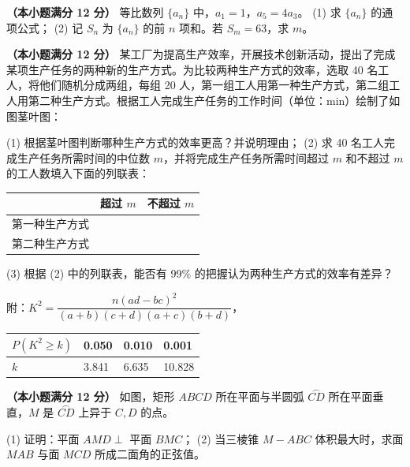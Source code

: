 \begin{question}
\textbf{（本小题满分 12 分）} 
等比数列 $\{a_n\}$ 中，$a_1 = 1$，$a_5 = 4a_3$。
(1) 求 $\{a_n\}$ 的通项公式；
(2) 记 $S_n$ 为 $\{a_n\}$ 的前 $n$ 项和。若 $S_m = 63$，求 $m$。

\Needspace{0.4\textheight}
\end{question}
\begin{question}
\textbf{（本小题满分 12 分）} 
某工厂为提高生产效率，开展技术创新活动，提出了完成某项生产任务的两种新的生产方式。为比较两种生产方式的效率，选取 40 名工人，将他们随机分成两组，每组 20 人，第一组工人用第一种生产方式，第二组工人用第二种生产方式。根据工人完成生产任务的工作时间（单位：min）绘制了如图茎叶图：
\nopagebreak[4]
\begin{center}\end{center}
\nopagebreak[4]
(1) 根据茎叶图判断哪种生产方式的效率更高？并说明理由；
(2) 求 40 名工人完成生产任务所需时间的中位数 $m$，并将完成生产任务所需时间超过 $m$ 和不超过 $m$ 的工人数填入下面的列联表：

\begin{center}
\begin{tabular}{lll}
\toprule
 & 超过 $m$ & 不超过 $m$ \\
\midrule
第一种生产方式 &  &  \\
第二种生产方式 &  &  \\
\bottomrule
\end{tabular}
\end{center}

(3) 根据 (2) 中的列联表，能否有 99\% 的把握认为两种生产方式的效率有差异？

附：$K^2 = \dfrac{n(ad - bc)^2}{(a + b)(c + d)(a + c)(b + d)}$，

\begin{center}
\begin{tabular}{llll}
\toprule
$P(K^2 \geqslant k)$ & 0.050 & 0.010 & 0.001 \\
\midrule
$k$ & 3.841 & 6.635 & 10.828 \\
\bottomrule
\end{tabular}
\end{center}

\Needspace{0.4\textheight}
\end{question}
\begin{question}
\textbf{（本小题满分 12 分）} 
如图，矩形 $ABCD$ 所在平面与半圆弧 $\overset{\frown}{CD}$ 所在平面垂直，$M$ 是 $\overset{\frown}{CD}$ 上异于 $C, D$ 的点。
\nopagebreak[4]
\begin{center}\end{center}
\nopagebreak[4]
(1) 证明：平面 $AMD \perp$ 平面 $BMC$；
(2) 当三棱锥 $M - ABC$ 体积最大时，求面 $MAB$ 与面 $MCD$ 所成二面角的正弦值。

\end{question}
